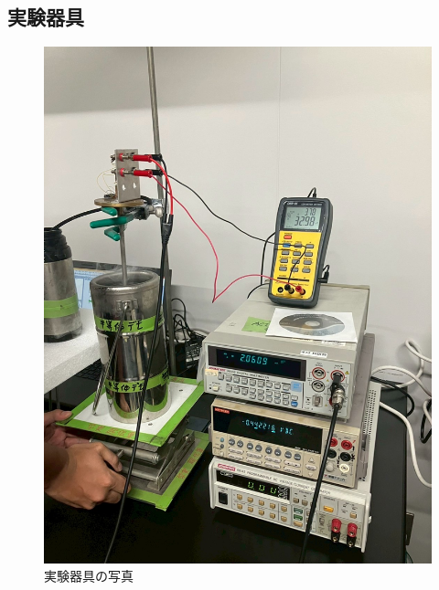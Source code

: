 \documentclass[11pt]{ltjsarticle}
\begin{document}
    \subsection*{実験器具}
      \begin{figure}[H]
        \centering
        \begin{minipage}[H]{0.48\textwidth}
          \centering
          \includegraphics[width=\columnwidth]{jikkenkigu.jpg}
          \caption{実験器具の写真}
          \label{fig:kigu_pic}
        \end{minipage}
        \begin{minipage}[H]{0.48\textwidth}
          \centering

\end{minipage}
\end{figure}
\end{document}

